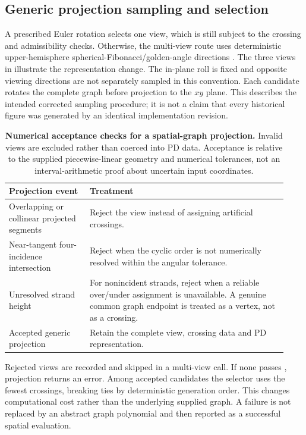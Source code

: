 \documentclass[10pt,twocolumn]{article}
\begin{document}
\subsection{Generic projection sampling and selection}
\label{supp:projection_sampling}
A prescribed Euler rotation selects one view, which is still subject to the crossing and admissibility checks. Otherwise, the multi-view route uses deterministic upper-hemisphere spherical-Fibonacci/golden-angle directions \cite{kg_keinert2015fibonacci}. The three views in  illustrate the representation change. The in-plane roll is fixed and opposite viewing directions are not separately sampled in this convention. Each candidate rotates the complete graph before projection to the $xy$ plane. This describes the intended corrected sampling procedure; it is not a claim that every historical figure was generated by an identical implementation revision.

\begin{table}[!t]
\centering\small
\begin{tabular}{p{0.27\linewidth}p{0.66\linewidth}}
\hline
\textbf{Projection event} & \textbf{Treatment}\\\hline
Overlapping or collinear projected segments & Reject the view instead of assigning artificial crossings.\\[0.35em]
Near-tangent four-incidence intersection & Reject when the cyclic order is not numerically resolved within the angular tolerance.\\[0.35em]
Unresolved strand height & For nonincident strands, reject when a reliable over/under assignment is unavailable. A genuine common graph endpoint is treated as a vertex, not as a crossing.\\[0.35em]
Accepted generic projection & Retain the complete view, crossing data and PD representation.\\\hline
\end{tabular}
\caption{\textbf{Numerical acceptance checks for a spatial-graph projection.} Invalid views are excluded rather than coerced into PD data. Acceptance is relative to the supplied piecewise-linear geometry and numerical tolerances, not an interval-arithmetic proof about uncertain input coordinates.}
\label{supptab:projection_acceptance}
\end{table}

Rejected views are recorded and skipped in a multi-view call. If none passes , projection returns an error. Among accepted candidates the selector uses the fewest crossings, breaking ties by deterministic generation order. This changes computational cost rather than the underlying supplied graph. A failure is not replaced by an abstract graph polynomial and then reported as a successful spatial evaluation.
\end{document}

